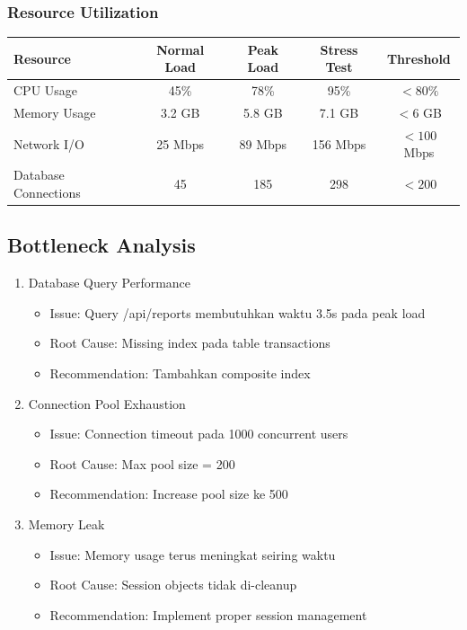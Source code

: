 \documentclass[12pt,a4paper]{article}
\begin{document}
\subsubsection{Resource Utilization}
\begin{tabularx}{\textwidth}{@{}lcccc@{}}
\toprule
Resource & Normal Load & Peak Load & Stress Test & Threshold \\
\midrule
CPU Usage & 45\% & 78\% & 95\% & $<80\%$ \\
Memory Usage & 3.2 GB & 5.8 GB & 7.1 GB & $<6$ GB \\
Network I/O & 25 Mbps & 89 Mbps & 156 Mbps & $<100$ Mbps \\
Database Connections & 45 & 185 & 298 & $<200$ \\
\bottomrule
\end{tabularx}

\subsection{Bottleneck Analysis}
\begin{enumerate}
  \item Database Query Performance
  \begin{itemize}
    \item Issue: Query /api/reports membutuhkan waktu 3.5s pada peak load
    \item Root Cause: Missing index pada table transactions
    \item Recommendation: Tambahkan composite index
  \end{itemize}
  \item Connection Pool Exhaustion
  \begin{itemize}
    \item Issue: Connection timeout pada 1000 concurrent users
    \item Root Cause: Max pool size = 200
    \item Recommendation: Increase pool size ke 500
  \end{itemize}
  \item Memory Leak
  \begin{itemize}
    \item Issue: Memory usage terus meningkat seiring waktu
    \item Root Cause: Session objects tidak di-cleanup
    \item Recommendation: Implement proper session management
  \end{itemize}
\end{enumerate}
\end{document}
